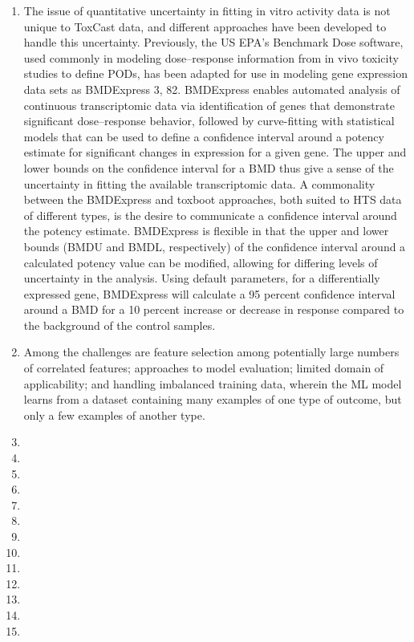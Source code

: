 \begin{enumerate}
    \item The issue of quantitative uncertainty in fitting in vitro activity data is not unique to ToxCast data, and different approaches have been developed to handle this uncertainty. Previously, the US EPA's Benchmark Dose software, used commonly in modeling dose–response information from in vivo toxicity studies to define PODs, has been adapted for use in modeling gene expression data sets as BMDExpress 3, 82. BMDExpress enables automated analysis of continuous transcriptomic data via identification of genes that demonstrate significant dose–response behavior, followed by curve-fitting with statistical models that can be used to define a confidence interval around a potency estimate for significant changes in expression for a given gene. The upper and lower bounds on the confidence interval for a BMD thus give a sense of the uncertainty in fitting the available transcriptomic data. A commonality between the BMDExpress and toxboot approaches, both suited to HTS data of different types, is the desire to communicate a confidence interval around the potency estimate. BMDExpress is flexible in that the upper and lower bounds (BMDU and BMDL, respectively) of the confidence interval around a calculated potency value can be modified, allowing for differing levels of uncertainty in the analysis. Using default parameters, for a differentially expressed gene, BMDExpress will calculate a 95 percent confidence interval around a BMD for a 10 percent increase or decrease in response compared to the background of the control samples.
    \item Among the challenges are feature selection among potentially large numbers of correlated features; approaches to model evaluation; limited domain of applicability; and handling imbalanced training data, wherein the ML model learns from a dataset containing many examples of one type of outcome, but only a few examples of another type.
    \item
    \item
    \item
    \item
    \item
    \item
    \item
    \item
    \item
    \item
    \item
    \item
    \item

\end{enumerate}

